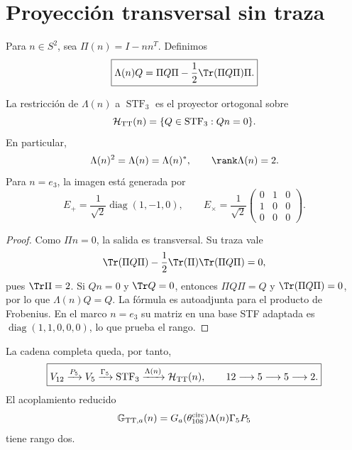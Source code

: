 \section{Proyecci\'on transversal sin traza}

Para \(n\in S^2\), sea \(\Pi(n)=I-nn^T\). Definimos
\begin{equation}
\label{rm:eq:gravity-lambda-tt}
\boxed{
\Lambda(n)Q
=\Pi Q\Pi-\frac12\Tr(\Pi Q\Pi)\Pi.}
\end{equation}

\begin{theorem}
\label{rm:thm:gravity-tt}
La restricci\'on de \(\Lambda(n)\) a \(\operatorname{STF}_3\) es el
proyector ortogonal sobre
\begin{equation}
\label{rm:eq:gravity-htt}
\mathcal H_{\rm TT}(n)
=\{Q\in\operatorname{STF}_3:Qn=0\}.
\end{equation}
En particular,
\begin{equation}
\label{rm:eq:gravity-lambda-properties}
\Lambda(n)^2=\Lambda(n)=\Lambda(n)^*,
\qquad \rank\Lambda(n)=2.
\end{equation}
Para \(n=e_3\), la imagen est\'a generada por
\begin{equation}
\label{rm:eq:gravity-plus-cross}
E_+=\frac1{\sqrt2}\operatorname{diag}(1,-1,0),
\qquad
E_\times=\frac1{\sqrt2}
\begin{pmatrix}0&1&0\\1&0&0\\0&0&0\end{pmatrix}.
\end{equation}
\end{theorem}

\begin{proof}
Como \(\Pi n=0\), la salida es transversal. Su traza vale
\[
\Tr(\Pi Q\Pi)-\frac12\Tr(\Pi)\Tr(\Pi Q\Pi)=0,
\]
pues \(\Tr\Pi=2\). Si \(Qn=0\) y \(\Tr Q=0\), entonces
\(\Pi Q\Pi=Q\) y \(\Tr(\Pi Q\Pi)=0\), por lo que
\(\Lambda(n)Q=Q\). La f\'ormula es autoadjunta para el producto de
Frobenius. En el marco \(n=e_3\) su matriz en una base STF adaptada es
\(\operatorname{diag}(1,1,0,0,0)\), lo que prueba el rango.
\end{proof}

La cadena completa queda, por tanto,
\begin{equation}
\label{rm:eq:gravity-12-5-5-2}
\boxed{
V_{12}\xrightarrow{P_5}V_5
\xrightarrow{\Gamma_5}\operatorname{STF}_3
\xrightarrow{\Lambda(n)}\mathcal H_{\rm TT}(n),
\qquad 12\longrightarrow5\longrightarrow5\longrightarrow2.}
\end{equation}
El acoplamiento reducido
\begin{equation}
\label{rm:eq:gravity-effective-map}
\mathbb G_{{\rm TT},a}(n)
=G_a(\theta_{108}^{\rm circ})\Lambda(n)\Gamma_5P_5
\end{equation}
tiene rango dos.
